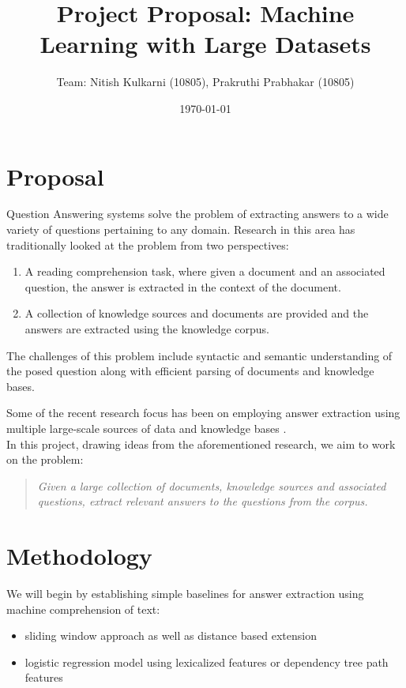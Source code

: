 \documentclass[11pt,a4paper,English]{article}
\title{Project Proposal: Machine Learning with Large Datasets}
\author{
    Team:
    Nitish Kulkarni (10805), 
    Prakruthi Prabhakar (10805)
}
\date{\today}
\begin{document}
\maketitle

\section{Proposal}

Question Answering systems solve the problem of extracting answers to a wide variety of questions pertaining to any domain. Research in this area has traditionally looked at the problem from two perspectives:
\begin{enumerate}
\item A reading comprehension task, where given a document and an associated question, the answer is extracted in the context of the document.
\item A collection of knowledge sources and documents are provided and the answers are extracted using the knowledge corpus.
\end{enumerate}

The challenges of this problem include syntactic and semantic understanding of the posed question along with efficient parsing of documents and knowledge bases. 

Some of the recent research focus has been on employing answer extraction using multiple large-scale sources of data and knowledge bases \cite{babi_paper1, babi_paper2}. \\

 In this project, drawing ideas from the aforementioned research, we aim to work on the problem:
\begin{quote}
    \textit{Given a large collection of documents, knowledge sources and associated questions, extract relevant answers to the questions from the corpus.}
\end{quote}

\section{Methodology}

We will begin by establishing simple baselines for answer extraction using machine comprehension of text: 
\begin{itemize}
\item sliding window approach as well as distance based extension \cite{mctest}
\item logistic regression model using lexicalized features or dependency tree path features \cite{squad}
\end{itemize}
\end{document}
